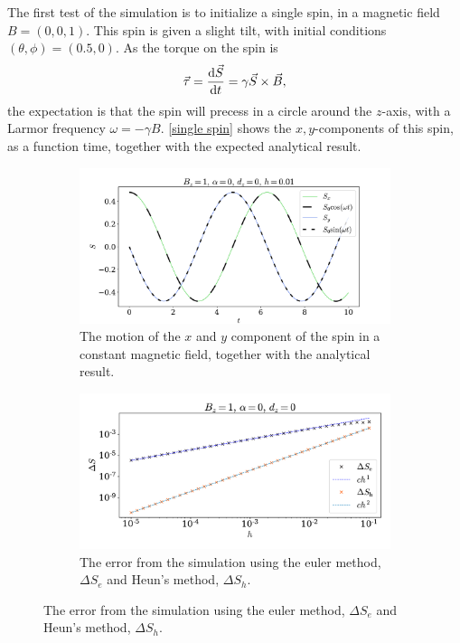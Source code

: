 \documentclass{article}
\begin{document}
    The first test of the simulation is to initialize a single spin, in a magnetic field $B = (0, 0, 1)$.
    This spin is given a slight tilt, with initial conditions $(\theta, \phi) = (0.5, 0)$.
    As the torque on the spin is 
    \begin{equation*}
        \vec \tau = \dv{\vec S}{t} = \gamma \vec{S} \times \vec{B},
    \end{equation*}
    the expectation is that the spin will precess in a circle around the $z$-axis, with a Larmor frequency $\omega = -\gamma B$.
    \autoref{single spin} shows the $x,y$-components of this spin, as a function time, together with the expected analytical result.

    \begin{figure}[H]
        \centering
        \begin{subfigure}{.52\textwidth}             
            \includegraphics[width=\textwidth]{../plots/single.pdf}
            \caption{The motion of the $x$ and $y$ component of the spin in a constant magnetic field, together with the analytical result.}
            \label{single spin}
        \end{subfigure}
        \begin{subfigure}{.44\textwidth}                    
            \centering
            \includegraphics[width=\textwidth]{../plots/err.pdf}
            \caption{The error from the simulation using the euler method, $\Delta S_e$ and Heun's method, $\Delta S_h$.}
            \label{error}
        \end{subfigure}
    \end{figure}
    
\end{document}
